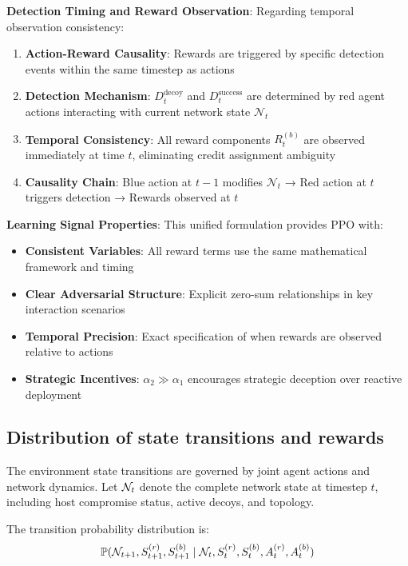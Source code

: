 \documentclass[12pt,twoside]{article}
\theoremstyle{definition}
\theoremstyle{plain}
\begin{document}
\textbf{Detection Timing and Reward Observation}:
Regarding temporal observation consistency:
\begin{enumerate}
\item \textbf{Action-Reward Causality}: Rewards are triggered by specific detection events within the same timestep as actions
\item \textbf{Detection Mechanism}: $D_t^{\text{decoy}}$ and $D_t^{\text{success}}$ are determined by red agent actions interacting with current network state $\mathcal{N}_t$
\item \textbf{Temporal Consistency}: All reward components $R_t^{(b)}$ are observed immediately at time $t$, eliminating credit assignment ambiguity
\item \textbf{Causality Chain}: Blue action at $t-1$ modifies $\mathcal{N}_t$ → Red action at $t$ triggers detection → Rewards observed at $t$
\end{enumerate}

\textbf{Learning Signal Properties}:
This unified formulation provides PPO with:
\begin{itemize}
\item \textbf{Consistent Variables}: All reward terms use the same mathematical framework and timing
\item \textbf{Clear Adversarial Structure}: Explicit zero-sum relationships in key interaction scenarios
\item \textbf{Temporal Precision}: Exact specification of when rewards are observed relative to actions
\item \textbf{Strategic Incentives}: $\alpha_2 \gg \alpha_1$ encourages strategic deception over reactive deployment
\end{itemize}

\subsection{Distribution of state transitions and rewards}

The environment state transitions are governed by joint agent actions and network dynamics. Let $\mathcal{N}_t$ denote the complete network state at timestep $t$, including host compromise status, active decoys, and topology.

The transition probability distribution is:
\begin{equation}
\mathbb{P}(\mathcal{N}_{t+1}, S_{t+1}^{(r)}, S_{t+1}^{(b)} \mid \mathcal{N}_t, S_t^{(r)}, S_t^{(b)}, A_t^{(r)}, A_t^{(b)})
\end{equation}
\end{document}
